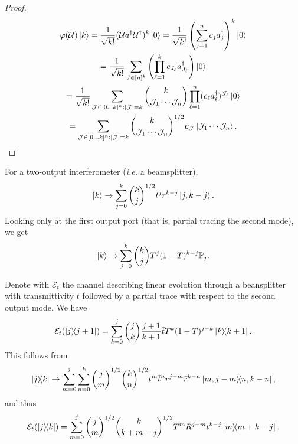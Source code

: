 \documentclass[12pt]{report}
\newcommand{\PP}{\mathbb{P}}
\newcommand{\bs}[1]{\boldsymbol{#1}}
\newcommand{\calE}{{\mathcal{E}}}
\newcommand{\calJ}{{\mathcal{J}}}
\newcommand{\calU}{{\mathcal{U}}}
\begin{document}
\begin{proof}
	\begin{equation}
	\begin{gathered}
		\varphi(\calU) \ket k
		= \frac{1}{\sqrt{k!}}(\calU a^\dagger \calU^\dagger)^k \ket0
		= \frac{1}{\sqrt{k!}}
		\left(
			\sum_{j=1}^n c_j a_j^\dagger
		\right)^k \ket 0 \\
		= \frac{1}{\sqrt{k!}}
		\sum_{J\in [n]^k} \left(\prod_{\ell=1}^k c_{J_\ell} a_{J_\ell}^\dagger\right) \ket0 \\
		= \frac{1}{\sqrt{k!}}
		\sum_{\calJ\in[0...k]^n : |\calJ|=k}
		\binom{k}{\calJ_1\cdots \calJ_n}
		\prod_{\ell=1}^n (c_\ell a_{\ell}^\dagger)^{\calJ_\ell} \ket0 \\
		= \sum_{\calJ\in[0...k]^n : |\calJ|=k}
		\binom{k}{\calJ_1\cdots \calJ_n}^{1/2}
		\bs c_\calJ \ket{\calJ_1\cdots \calJ_n}.
	\end{gathered}
	\end{equation}
\end{proof}

\begin{example}
	For a two-output interferometer (\emph{i.e.} a beamsplitter),
	\begin{equation}
		\ket k \to
		\sum_{j=0}^k \binom{k}{j}^{1/2} t^j r^{k-j} \ket{j,k-j}.
	\end{equation}
	Looking only at the first output port (that is, partial tracing the second mode), we get
	\begin{equation}
		\ket k \to
		\sum_{j=0}^k \binom{k}{j} T^j (1-T)^{k-j} \PP_j.
	\end{equation}
\end{example}

\begin{example}
	Denote with $\calE_t$ the channel describing linear evolution through a beansplitter with transmittivity $t$ followed by a partial trace with respect to the second output mode. We have
	\begin{equation}
		\calE_t(\ketbra{j}{j+1})
		= \sum_{k=0}^j \binom{j}{k} \frac{j+1}{k+1}
		\bar t T^k (1-T)^{j-k} \ketbra{k}{k+1}.
	\end{equation}
	This follows from
	\begin{equation}
		\ketbra{j}{k} \to
		\sum_{m=0}^j \sum_{n=0}^k
		\binom{j}{m}^{1/2} \binom{k}{n}^{1/2}
		t^{m} \bar t^n r^{j-m} \bar r^{k-n}
		\ketbra{m,j-m}{n,k-n},
	\end{equation}
	and thus
	\begin{equation}
		\calE_t(\ketbra{j}{k})
		= \sum_{m=0}^j \binom{j}{m}^{1/2} \binom{k}{k+m-j}^{1/2}
		T^m R^{j-m} \bar t^{k-j}
		\ketbra{m}{m+k-j}.
	\end{equation}
\end{example}
\end{document}

